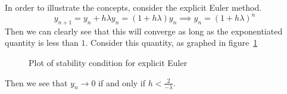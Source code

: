 \documentclass[../Main.tex]{subfiles}
\begin{document}
In order to illustrate the concepts, consider the explicit Euler method.
\begin{equation*}
    y_{n+1} = y_n + h \lambda y_n = (1 + h \lambda) y_n \implies y_n = (1 + h \lambda)^n
\end{equation*}
Then we can clearly see that this will converge as long as the exponentiated quantity is less than $1$. Consider this quantity, as graphed in figure~\ref{figModGraph}

\begin{figure}
    \centering
    \caption{Plot of stability condition for explicit Euler}
    \label{figModGraph}
\end{figure}

Then we see that $y_n \to 0$ if and only if $h < \frac{2}{-\lambda}$.
\end{document}
